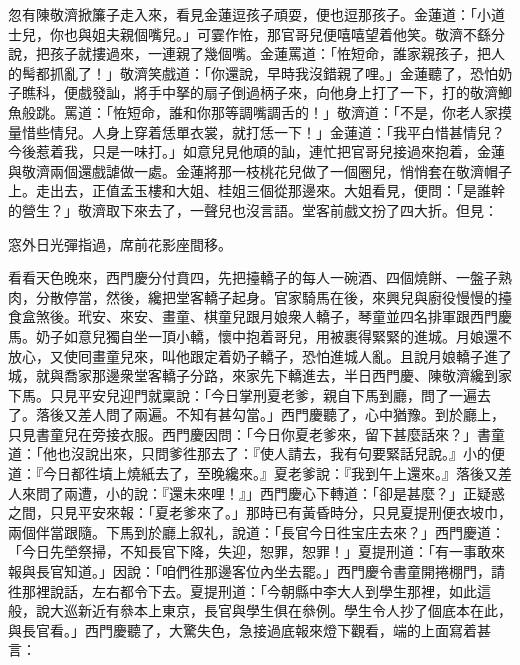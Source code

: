 忽有陳敬濟掀簾子走入來，看見金蓮逗孩子頑耍，便也逗那孩子。金蓮道：「小道士兒，你也與姐夫親個嘴兒。」可霎作恠，那官哥兒便嘻嘻望着他笑。{}敬濟不繇分說，把孩子就摟過來，一連親了幾個嘴。金蓮罵道：「恠短命，誰家親孩子，把人的髩都抓亂了！」敬濟笑戲道：「你還說，早時我沒錯親了哩。」{}金蓮聽了，恐怕奶子瞧科，便戲發訕，將手中拏的扇子倒過柄子來，向他身上打了一下，打的敬濟鯽魚般跳。罵道：「恠短命，誰和你那等調嘴調舌的！」敬濟道：「不是，你老人家摸量惜些情兒。人身上穿着恁單衣裳，就打恁一下！」金蓮道：「我平白惜甚情兒？今後惹着我，只是一味打。」{}如意兒見他頑的訕，連忙把官哥兒接過來抱着，金蓮與敬濟兩個還戲謔做一處。金蓮將那一枝桃花兒做了一個圈兒，悄悄套在敬濟帽子上。{}走出去，正值孟玉樓和大姐、桂姐三個從那邊來。大姐看見，便問：「是誰幹的營生？」敬濟取下來去了，一聲兒也沒言語。堂客前戲文扮了四大折。但見：

窓外日光彈指過，席前花影座間移。

看看天色晚來，西門慶分付賁四，先把擡轎子的每人一碗酒、四個燒餅、一盤子熟肉，分散停當，然後，纔把堂客轎子起身。官家騎馬在後，來興兒與廚役慢慢的擡食盒煞後。玳安、來安、畫童、棋童兒跟月娘衆人轎子，琴童並四名排軍跟西門慶馬。奶子如意兒獨自坐一頂小轎，懷中抱着哥兒，用被裹得緊緊的進城。月娘還不放心，又使囘畫童兒來，叫他跟定着奶子轎子，恐怕進城人亂。{}且說月娘轎子進了城，就與喬家那邊衆堂客轎子分路，來家先下轎進去，半日西門慶、陳敬濟纔到家下馬。只見平安兒迎門就稟說：「今日掌刑夏老爹，親自下馬到廳，問了一遍去了。落後又差人問了兩遍。不知有甚勾當。」{}西門慶聽了，心中猶豫。到於廳上，只見書童兒在旁接衣服。西門慶因問：「今日你夏老爹來，留下甚麼話來？」書童道：「他也沒說出來，只問爹徃那去了：『使人請去，我有句要緊話兒說。』小的便道：『今日都徃墳上燒紙去了，至晚纔來。』夏老爹說：『我到午上還來。』落後又差人來問了兩遭，小的說：『還未來哩！』」西門慶心下轉道：「卻是甚麼？」正疑惑之間，只見平安來報：「夏老爹來了。」那時已有黃昏時分，只見夏提刑便衣坡巾，兩個伴當跟隨。下馬到於廳上叙礼，說道：「長官今日徃宝庄去來？」西門慶道：「今日先塋祭掃，不知長官下降，失迎，恕罪，恕罪！」夏提刑道：「有一事敢來報與長官知道。」因說：「咱們徃那邊客位內坐去罷。」西門慶令書童開捲棚門，請徃那裡說話，左右都令下去。夏提刑道：「今朝縣中李大人到學生那裡，如此這般，說大巡新近有叅本上東京，長官與學生俱在叅例。學生令人抄了個底本在此，與長官看。」西門慶聽了，大驚失色，急接過底報來燈下觀看，端的上面寫着甚言：

